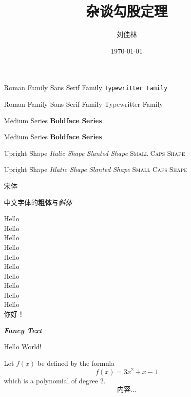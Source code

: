 \documentclass[10pt]{ctexart}%
\title{\heiti 杂谈勾股定理}
\author{\kaishu 刘佳林}
\date{\today}
\newcommand{\myfont}{\textit{\textbf{\textsf{Fancy Text}}}}%
\begin{document}
	\textrm{Roman Family} \textsf{Sans Serif Family} \texttt{Typewritter Family}%
	
    \rmfamily Roman Family {\sffamily Sans Serif Family} {\ttfamily Typewritter Family}%
    
    \textmd{Medium Series} \textbf{Boldface Series}
    
    {\mdseries Medium Series} {\bfseries Boldface Series}
    
    \textup{Upright Shape} \textit{Italic Shape}
    \textsl{Slanted Shape} \textsc{Small Caps Shape}%
    
    {\upshape Upright Shape} {\itshape Itlatic Shape} {\slshape Slanted Shape} {\scshape Small Caps Shape}%
    
    {\songti 宋体}   
    
    中文字体的\textbf{粗体}与\textit{斜体}
    
    {\ting           Hello}\\
    {\scriptsize     Hello}\\
    {\footnotesize   Hello}\\
    {\small          Hello}\\
    {\normalsize     Hello}\\
    {\large          Hello}\\
    {\Large          Hello}\\
    {\LARGE          Hello}\\
    {\huge           Hello}\\
    {\Huge           Hello}\\%
    
     你好！%
    
    \myfont   
    
    
    \maketitle
	Hello World!%
	
	Let $f(x)$ be defined by the formula
	$$f(x)=3x^2+x-1$$ which is a polynomial of degree 2.
	\begin{equation}
		内容...
	\end{equation}%
\end{document}
